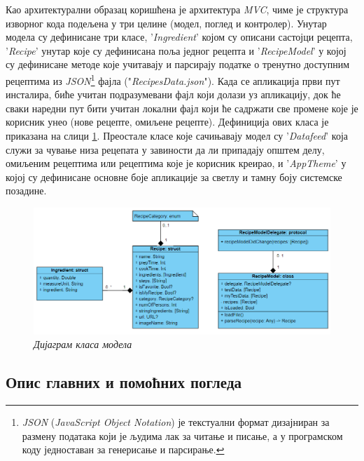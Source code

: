 \documentclass[12pt,oneside]{memoir}
\begin{document}
Као архитектурални образац коришћена је архитектура \textit{MVC}, чиме је структура изворног кода подељена у три целине (модел, поглед и контролер). Унутар модела су дефинисане три класе, '\textit{Ingredient}' којом су описани састојци рецепта, '\textit{Recipe}' унутар које су дефинисана поља једног рецепта и '\textit{RecipeModel}' у којој су дефинисане методе које учитавају и парсирају податке о тренутно доступним рецептима из \textit{JSON}\footnote{\textit{JSON} (\textit{JavaScript Object Notation}) је текстуални формат дизајниран за размену података који је људима лак за читање и писање, а у програмском коду једноставан за генерисање и парсирање.} фајла ("\textit{RecipesData.json}"). Када се апликација први пут инсталира, биће учитан подразумевани фајл који долази уз апликацију, док ће сваки наредни пут бити учитан локални фајл који ће садржати све промене које је корисник унео (нове рецепте, омиљене рецепте). Дефиниција ових класа је приказана на слици \ref{slika:класе_модела}. Преостале класе које сачињавају модел су '\textit{Datafeed}' која служи за чување низа рецепата у завиности да ли припадају општем делу, омиљеним рецептима или рецептима које је корисник креирао, и '\textit{AppTheme}' у којој су дефинисане основне боје апликације за светлу и тамну боју системске позадине.

\begin{figure} [H]
    \centering
    \captionsetup{justification=centering}
    \includegraphics[width=1\textwidth]{images/class_diagram.png} 
    \caption{\textit{Дијаграм класа модела}}
    \label{slika:класе_модела}
\end{figure}

\subsection{Опис главних и помоћних погледа}
\end{document}
